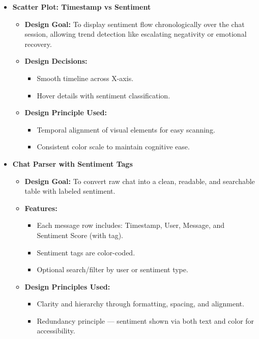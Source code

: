 \documentclass{article}\usepackage{graphicx}
\begin{document}
\begin{itemize}
    \item \textbf{Scatter Plot: Timestamp vs Sentiment}
    \begin{itemize}
        \item \textbf{Design Goal:} To display sentiment flow chronologically over the chat session, allowing trend detection like escalating negativity or emotional recovery.
        \item \textbf{Design Decisions:}
        \begin{itemize}
            \item Smooth timeline across X-axis.
            \item Hover details with sentiment classification.
        \end{itemize}
        \item \textbf{Design Principle Used:}
        \begin{itemize}
            \item Temporal alignment of visual elements for easy scanning.
            \item Consistent color scale to maintain cognitive ease.
        \end{itemize}
    \end{itemize}
    
    \item \textbf{Chat Parser with Sentiment Tags}
    \begin{itemize}
        \item \textbf{Design Goal:} To convert raw chat into a clean, readable, and searchable table with labeled sentiment.
        \item \textbf{Features:}
        \begin{itemize}
            \item Each message row includes: Timestamp, User, Message, and Sentiment Score (with tag).
            \item Sentiment tags are color-coded.
            \item Optional search/filter by user or sentiment type.
        \end{itemize}
        \item \textbf{Design Principles Used:}
        \begin{itemize}
            \item Clarity and hierarchy through formatting, spacing, and alignment.
            \item Redundancy principle — sentiment shown via both text and color for accessibility.
        \end{itemize}

        
    \end{itemize}
\end{itemize}
\end{document}
